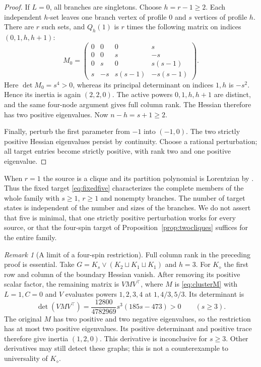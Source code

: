 \documentclass[11pt]{article}
\theoremstyle{remark}
\newtheorem{remark}[theorem]{Remark}
\begin{document}
\begin{proof}
If $L=0$, all branches are singletons. Choose $h=r-1\geq2$.
Each independent $h$-set leaves one branch vertex of profile $0$
and $s$ vertices of profile $h$. There are $r$ such sets, and
$Q_h(1)$ is $r$ times the following matrix on indices $(0,1,h,h+1)$:
\begin{equation}
 M_0=\begin{pmatrix}
 0&0&0&s\\0&0&s&-s\\
 0&s&0&s(s-1)\\s&-s&s(s-1)&-s(s-1)
 \end{pmatrix}.                                      \label{eq:clusterMzero}
\end{equation}
Here $\det M_0=s^4>0$, whereas its principal determinant on
indices $1,h$ is $-s^2$. Hence its inertia is again $(2,2,0)$.
The active powers $0,1,h,h+1$ are distinct, and the same four-node
argument gives full column rank. The Hessian therefore has two
positive eigenvalues. Now $n-h=s+1\geq2$.

Finally, perturb the first parameter from $-1$ into $(-1,0)$.
The two strictly positive Hessian eigenvalues persist by continuity.
Choose a rational perturbation; all target entries become strictly
positive, with rank two and one positive eigenvalue.
\end{proof}

When $r=1$ the source is a clique and its partition polynomial
is Lorentzian by \cite[Theorem 3.1]{LOS}. Thus the fixed target
\eqref{eq:fixedfive} characterizes the complete members of the
whole family with $s\geq1$, $r\geq1$ and nonempty branches.
The number of target states is independent of the number and sizes
of the branches. We do not assert that five is minimal, that one
strictly positive perturbation works for every source, or that the
four-spin target of Proposition~\ref{prop:twocliques} suffices for
the entire family.



\begin{remark}[A limit of a four-spin restriction]\label{rem:fourrestriction}
Full column rank in the preceding proof is essential. Take
$G=K_s\vee(K_2\sqcup K_1\sqcup K_1)$ and $h=3$. For
$K_{\diamond}$ the first row and column of the boundary Hessian
vanish. After removing its positive scalar factor, the remaining
matrix is $VMV^\top$, where $M$ is \eqref{eq:clusterM} with
$L=1,C=0$ and $V$ evaluates powers $1,2,3,4$ at $1,4/3,5/3$.
Its determinant is
\[
 \det(VMV^\top)=\frac{12800}{4782969}s^3(185s-473)>0
 \qquad(s\geq3).
\]
The original $M$ has two positive and two negative eigenvalues,
so the restriction has at most two positive eigenvalues. Its
positive determinant and positive trace therefore give inertia
$(1,2,0)$. This derivative is inconclusive for $s\geq3$.
Other derivatives may still detect these graphs; this is not a
counterexample to universality of $K_{\diamond}$.
\end{remark}
\end{document}
